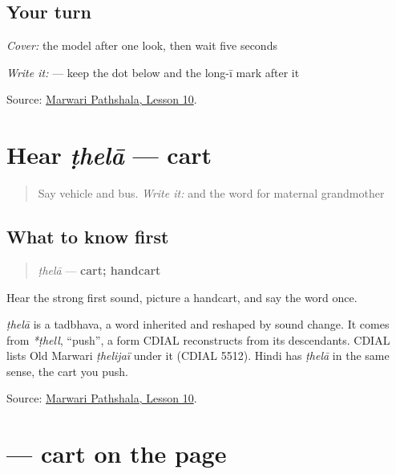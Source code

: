 \subsection*{Your turn}
\emph{Cover:} the model after one look, then wait five seconds

\emph{Write it:} \textbf{} — keep the dot below \textbf{} and the long-ī mark after it

\begin{tcolorbox}[breakable,colback=teal!4,colframe=teal!35!black,title={Before you move on}]
Source: \href{https://www.marwaripathshala.com/marwari-lesson-10-english}{Marwari Pathshala, Lesson 10}.
\end{tcolorbox}
\section[ṭhelā]{Hear \emph{ṭhelā} — cart}

\label{lesson:MW-C16-hear-thela}



\begin{quote}
Say vehicle and bus. \emph{Write it:} \textbf{} and the word for maternal grandmother
\end{quote}

\subsection*{What to know first}
\begin{quote}
\emph{ṭhelā} — \textbf{cart; handcart}
\end{quote}

Hear the strong first sound, picture a handcart, and say the word once.

\begin{cousinweb}
\emph{ṭhelā} is a tadbhava, a word inherited and reshaped by sound change. It comes from \emph{*ṭhell}, \textquotedblleft{}push\textquotedblright{}, a form CDIAL reconstructs from its descendants. CDIAL lists Old Marwari \emph{ṭhelijaï} under it (CDIAL 5512). Hindi has \emph{ṭhelā} in the same sense, the cart you push.
\end{cousinweb}

\begin{tcolorbox}[breakable,colback=teal!4,colframe=teal!35!black,title={Before you move on}]
Source: \href{https://www.marwaripathshala.com/marwari-lesson-10-english}{Marwari Pathshala, Lesson 10}.
\end{tcolorbox}
\section[\texorpdfstring{\mw{ठेला} (ṭhelā)}{ठेला (ṭhelā)}]{ — cart on the page}


